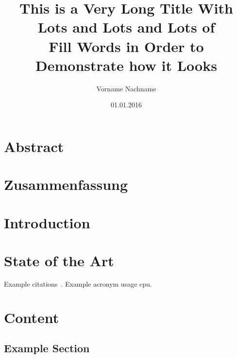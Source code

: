 \documentclass[%
]{tumDiss}
\title{%
  This is a Very Long Title With Lots and Lots and Lots of\\
  Fill Words in Order to Demonstrate how it Looks\\
}
\author{Vorname Nachname}
\date{01.01.2016}
\begin{document}
\frontmatter
\maketitle



\chapter{Abstract}

\lipsum[1-4]



\chapter{Zusammenfassung}

\lipsum[1-4]



\tableofcontents
\listoffigures
\listoftables
\printglossary[type=\acronymtype, nonumberlist]



\mainmatter
\chapter{Introduction}
\label{chap:introduction}

\lipsum[1-4]



\chapter{State of the Art}
\label{chap:sota}

Example citations~\cite{barham2003xen, LIS}.
Example acronym usage \gls{cpu}.


\chapter{Content}
\label{chap:content}

\lipsum[1]

\section{Example Section}
\end{document}
